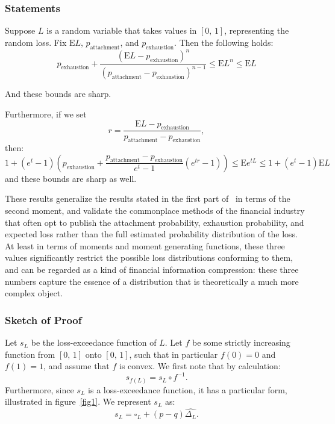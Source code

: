 \documentclass{amsart}
\theoremstyle{plain}
\theoremstyle{definition}
\theoremstyle{definition}
\theoremstyle{remark}
\begin{document}
\subsubsection{Statements}
Suppose \(L\) is a random variable that takes values in \(\left[0,\,1\right]\), representing the random loss. Fix \(\mathrm{E}L\), \(p_{\text{attachment}}\), and \(p_{\text{exhaustion}}\). Then the following holds:
\begin{equation*}
    p_{\text{exhaustion}} + \frac{\left(\mathrm{E}L - p_{\text{exhaustion}}\right)^{n}}{\left(p_{\text{attachment}}-p_{\text{exhaustion}}\right)^{n-1}} \leq \mathrm{E}L^{n} \leq \mathrm{E}L
\end{equation*}

And these bounds are sharp.

Furthermore, if we set
\begin{equation*}
r = \frac{\mathrm{E}L - p_{\text{exhaustion}}}{p_{\text{attachment}} - p_{\text{exhaustion}}},
\end{equation*}
then:
\begin{equation*}
    1 + \left(e^{t}-1\right)\left(p_{\text{exhaustion}} + \frac{p_{\text{attachment}}-p_{\text{exhaustion}}}{e^{t}-1}\left(e^{tr}-1\right)\right) \leq \mathrm{E}e^{tL} \leq 1 + \left(e^{t}-1\right) \mathrm{E}L
\end{equation*}
and these bounds are sharp as well.

These results generalize the results stated in the first part of~\cite{A:aviv-2018} in terms of the second moment, and validate the commonplace methods of the financial industry that often opt to publish the attachment probability, exhaustion probability, and expected loss rather than the full estimated probability distribution of the loss. At least in terms of moments and moment generating functions, these three values significantly restrict the possible loss distributions conforming to them, and can be regarded as a kind of financial information compression: these three numbers capture the essence of a distribution that is theoretically a much more complex object.

\subsubsection{Sketch of Proof}
Let \(s_{L}\) be the loss-exceedance function of \(L\). Let \(f\) be some strictly increasing function from \(\left[0,\,1\right]\) onto \(\left[0,\,1\right]\), such that in particular \(f \left(0\right) = 0\) and \(f \left(1\right) = 1\), and assume that \(f\) is convex.
We first note that by calculation:
\begin{equation*}
    s_{f \left(L\right)} = s_{L} \circ f^{-1}.
\end{equation*}
Furthermore, since \(s_{L}\) is a loss-exceedance function, it has a particular form, illustrated in figure~\ref{fig1}. We represent \(s_{L}\) as:
\begin{equation*}
    s_{L} = \square_{L}  + \left(p-q\right) \widehat{\Delta_{L}}.
\end{equation*}
\end{document}
